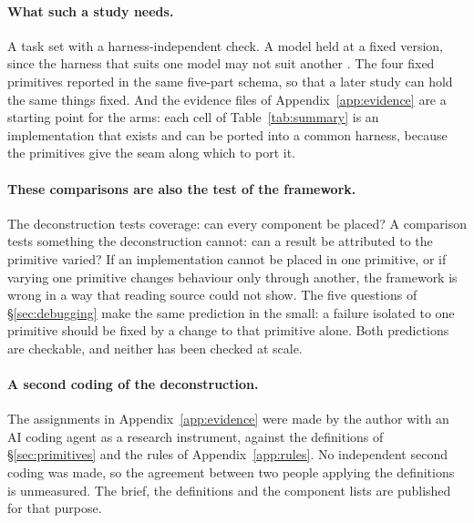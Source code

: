\paragraph{What such a study needs.} A task set with a harness-independent check. A model held at a fixed version, since the harness that suits one model may not suit another \citep{metr2025update}. The four fixed primitives reported in the same five-part schema, so that a later study can hold the same things fixed. And the evidence files of Appendix~\ref{app:evidence} are a starting point for the arms: each cell of Table~\ref{tab:summary} is an implementation that exists and can be ported into a common harness, because the primitives give the seam along which to port it.

\paragraph{These comparisons are also the test of the framework.} The deconstruction tests coverage: can every component be placed? A comparison tests something the deconstruction cannot: can a result be attributed to the primitive varied? If an implementation cannot be placed in one primitive, or if varying one primitive changes behaviour only through another, the framework is wrong in a way that reading source could not show. The five questions of \S\ref{sec:debugging} make the same prediction in the small: a failure isolated to one primitive should be fixed by a change to that primitive alone. Both predictions are checkable, and neither has been checked at scale.

\paragraph{A second coding of the deconstruction.} The assignments in Appendix~\ref{app:evidence} were made by the author with an AI coding agent as a research instrument, against the definitions of \S\ref{sec:primitives} and the rules of Appendix~\ref{app:rules}. No independent second coding was made, so the agreement between two people applying the definitions is unmeasured. The brief, the definitions and the component lists are published for that purpose.
